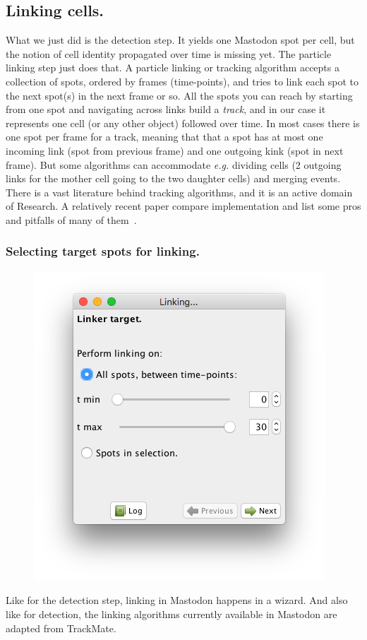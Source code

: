 \subsection{Linking cells.}

What we just did is the detection step. 
It yields one Mastodon spot per cell, but the notion of cell identity propagated over time is missing yet.
The particle linking step just does that.
A particle linking or tracking algorithm accepts a collection of spots, ordered by frames (time-points), and tries to link each spot to the next spot(s) in the next frame or so. 
All the spots you can reach by starting from one spot and navigating across links build a \textit{track}, and in our case it represents one cell (or any other object) followed over time. 
In most cases there is one spot per frame for a track, meaning that that a spot has at most one incoming link (spot from previous frame) and one outgoing kink (spot in next frame). 
But some algorithms can accommodate \textit{e.g.} dividing cells (2 outgoing links for the mother cell going to the two daughter cells) and merging events. There is a vast literature behind tracking algorithms, and it is an active domain of Research. A relatively recent paper compare implementation and list some pros and pitfalls of many of them~\cite{Chenouard2014}.

\subsubsection{Selecting target spots for linking.}

\begin{figure}
    \centering
    \includegraphics[height=0.3\textwidth,trim=0.5cm .5cm .5cm .5cm,clip]{figures/Mastodon_LinkingWizard_01.png}
\end{figure}

Like for the detection step, linking in Mastodon happens in a wizard.
And also like for detection, the linking algorithms currently available in Mastodon are adapted from TrackMate. 

